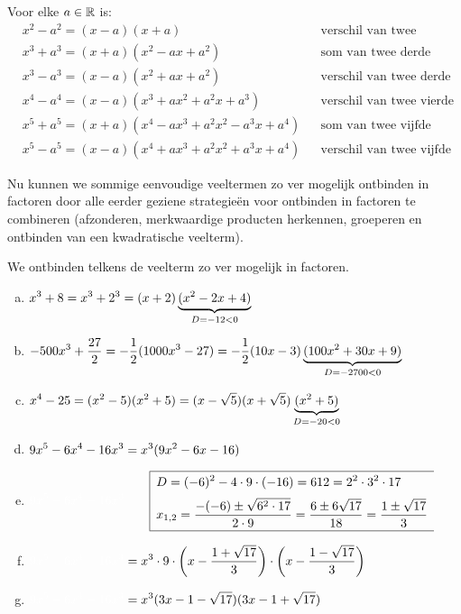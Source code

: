 \documentclass{ximera}
\begin{document}
\begin{proposition} 
Voor elke $a \in \mathbb{R}$ is:
\begin{align*}
& x^2 - a^2 = (x-a)(x+a) && \text{verschil van twee kwadraten} \\
& x^3 + a^3 = (x+a)(x^2 - ax + a^2) && \text{som van twee derde machten} \\
& x^3 - a^3 = (x-a)(x^2 + ax + a^2) && \text{verschil van twee derde machten} \\
& x^4 - a^4 = (x-a)(x^3 + ax^2 + a^2x + a^3) && \text{verschil van twee vierde machten} \\
& x^5 + a^5 = (x+a)(x^4 - ax^3 + a^2x^2 - a^3x + a^4) && \text{som van twee vijfde machten} \\
& x^5 - a^5 = (x-a)(x^4 + ax^3 + a^2x^2 + a^3x + a^4) && \text{verschil van twee vijfde machten.}
\end{align*}
\end{proposition} 



Nu kunnen we sommige eenvoudige veeltermen zo ver mogelijk ontbinden in factoren door alle eerder geziene strategie\"en voor ontbinden in factoren te combineren (afzonderen, merkwaardige producten herkennen, groeperen en ontbinden van een kwadratische veelterm).

\begin{example} 
We ontbinden telkens de veelterm zo ver mogelijk in factoren. 
\begin{enumerate}[(a)]
\item 
$\displaystyle x^3 + 8 = x^3 + 2^3 = (x+2)\underbrace{(x^2-2x+4)}_{D = -12 < 0}$
\item
$\displaystyle -500x^3 + \frac{27}{2} = -\frac{1}{2}(1000x^3 - 27) = -\frac{1}{2}(10x-3)\underbrace{(100x^2 + 30x + 9)}_{D = -2700 < 0}$
\item
$\displaystyle x^4-25 = (x^2 - 5)(x^2+5) = (x-\sqrt{5})(x+\sqrt{5})\underbrace{(x^2+5)}_{D = -20 < 0}$
\item
$\displaystyle 9x^5 - 6x^4 - 16x^3 = x^3(9x^2-6x-16)$ 
\item[]
$\D \mph{9x^5 - 6x^4 - 16x^3} \qquad 
\begin{array}{|l}
\hline
\begin{aligned}
\vrule height 0.4cm width 0cm
& D = (-6)^2-4\cdot 9 \cdot (-16) = 612 = 2^2 \cdot 3^2 \cdot 17 \\[0.1cm] 
& x_{1,2} = \frac{-(-6) \pm \sqrt{6^2 \cdot 17}}{2 \cdot 9} = \frac{6 \pm 6\sqrt{17}}{18} = \frac{1 \pm \sqrt{17}}{3} \\[0.1cm] 
\end{aligned} \\
\hline
\end{array}
$
\item[]
$\D \mph{9x^5 - 6x^4 - 16x^3} = x^3 \cdot 9 \cdot \left(x-\frac{1+\sqrt{17}}{3}\right)\cdot\left(x-\frac{1-\sqrt{17}}{3}\right)$
\item[]
$\D \mph{9x^5 - 6x^4 - 16x^3} = x^3(3x-1-\sqrt{17})(3x-1+\sqrt{17})$
\end{enumerate}
\end{example} 
\end{document}
